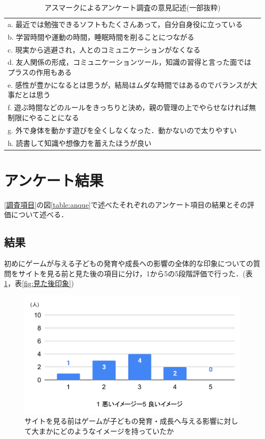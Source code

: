 \documentclass[12pt,a4j,titlepage]{ltjsarticle}
\begin{document}
\begin{table}[H]
 \caption{アスマークによるアンケート調査の意見記述(一部抜粋)}
 \label{table:asmarqanque}
 \small
 \centering
  \begin{tabular}{l}
  \hline
   a. 最近では勉強できるソフトもたくさんあって，自分自身役に立っている\\
   b. 学習時間や運動の時間，睡眠時間を削ることにつながる \\
   c. 現実から逃避され，人とのコミュニケーションがなくなる \\
   d. 友人関係の形成，コミュニケーションツール，知識の習得と言った面ではプラスの作用もある \\
   e. 感性が豊かになるとは思うが，結局はムダな時間ではあるのでバランスが大事だとは思う \\
   f. 遊ぶ時間などのルールをきっちりと決め，親の管理の上でやらせなければ無制限にやることになる\\
   g. 外で身体を動かす遊びを全くしなくなった．動かないので太りやすい \\
   h. 読書して知識や想像力を蓄えたほうが良い \\
   \hline
  \end{tabular}
\end{table}

\section{アンケート結果}
\ref{調査項目}の図\ref{table:anque}で述べたそれぞれのアンケート項目の結果とその評価について述べる．

\subsection{結果}
初めにゲームが与える子どもの発育や成長への影響の全体的な印象についての質問をサイトを見る前と見た後の項目に分け，1から5の5段階評価で行った．(表\ref{fig:見る前印象}，表\ref{fig:見た後印象})


\begin{figure}[H]
 \begin{center}
  \includegraphics[keepaspectratio, scale=0.5]{印象前.pdf}
 \end{center}
 \caption{サイトを見る前はゲームが子どもの発育・成長へ与える影響に対して大まかにどのようなイメージを持っていたか}
 \label{fig:見る前印象}
\end{figure}
\end{document}
